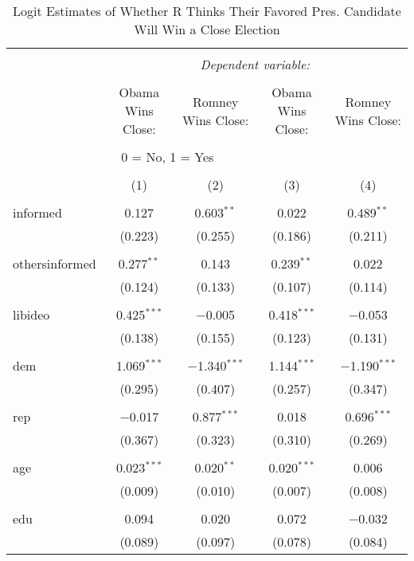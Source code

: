 \documentclass{article}
\begin{document}
\begin{table}[!htbp] \centering 
  \caption{Logit Estimates of Whether R Thinks Their Favored Pres. Candidate Will Win a Close Election} 
  \label{} 
\begin{tabular}{@{\extracolsep{5pt}}lcccc} 
\\[-1.8ex]\hline 
\hline \\[-1.8ex] 
 & \multicolumn{4}{c}{\textit{Dependent variable:}} \\ 
\cline{2-5} 
\\[-1.8ex] & Obama Wins Close: & Romney Wins Close: & Obama Wins Close: & Romney Wins Close: \\ 
\\[-1.8ex] \multicolumn{4}{c}{0 = No, 1 = Yes} \\ 
\\[-1.8ex] & (1) & (2) & (3) & (4)\\ 
\hline \\[-1.8ex] 
 informed & 0.127 & 0.603$^{**}$ & 0.022 & 0.489$^{**}$ \\ 
  & (0.223) & (0.255) & (0.186) & (0.211) \\ 
  & & & & \\ 
 othersinformed & 0.277$^{**}$ & 0.143 & 0.239$^{**}$ & 0.022 \\ 
  & (0.124) & (0.133) & (0.107) & (0.114) \\ 
  & & & & \\ 
 libideo & 0.425$^{***}$ & $-$0.005 & 0.418$^{***}$ & $-$0.053 \\ 
  & (0.138) & (0.155) & (0.123) & (0.131) \\ 
  & & & & \\ 
 dem & 1.069$^{***}$ & $-$1.340$^{***}$ & 1.144$^{***}$ & $-$1.190$^{***}$ \\ 
  & (0.295) & (0.407) & (0.257) & (0.347) \\ 
  & & & & \\ 
 rep & $-$0.017 & 0.877$^{***}$ & 0.018 & 0.696$^{***}$ \\ 
  & (0.367) & (0.323) & (0.310) & (0.269) \\ 
  & & & & \\ 
 age & 0.023$^{***}$ & 0.020$^{**}$ & 0.020$^{***}$ & 0.006 \\ 
  & (0.009) & (0.010) & (0.007) & (0.008) \\ 
  & & & & \\ 
 edu & 0.094 & 0.020 & 0.072 & $-$0.032 \\ 
  & (0.089) & (0.097) & (0.078) & (0.084) \\ 

\end{tabular}
\end{table}
\end{document}
